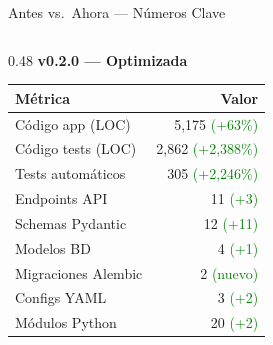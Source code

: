 \documentclass[aspectratio=169,10pt]{beamer}
\begin{document}
\begin{frame}{Antes vs.\ Ahora --- N\'umeros Clave}
\begin{columns}[T]
\begin{column}{0.48\textwidth}
\centering
{\large\textbf{v0.2.0 --- Optimizada}}\\[6pt]
\begin{tabular}{lr}
\toprule
\textbf{M\'etrica} & \textbf{Valor} \\
\midrule
C\'odigo app (LOC)       & 5{,}175 \textcolor{green}{(+63\%)} \\
C\'odigo tests (LOC)     & 2{,}862 \textcolor{green}{(+2{,}388\%)} \\
Tests autom\'aticos      & 305 \textcolor{green}{(+2{,}246\%)} \\
Endpoints API            & 11 \textcolor{green}{(+3)} \\
Schemas Pydantic         & 12 \textcolor{green}{(+11)} \\
Modelos BD               & 4 \textcolor{green}{(+1)} \\
Migraciones Alembic      & 2 \textcolor{green}{(nuevo)} \\
Configs YAML             & 3 \textcolor{green}{(+2)} \\
M\'odulos Python         & 20 \textcolor{green}{(+2)} \\
\bottomrule
\end{tabular}
\end{column}
\end{columns}

\end{frame}
\end{document}
